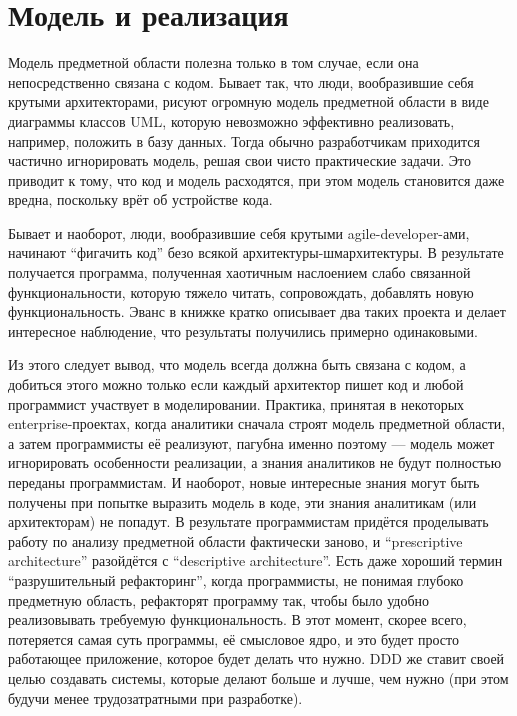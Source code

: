 \documentclass{../../text-style}
\begin{document}
\section{Модель и реализация}

Модель предметной области полезна только в том случае, если она непосредственно связана с кодом. Бывает так, что люди, вообразившие себя крутыми архитекторами, рисуют огромную модель предметной области в виде диаграммы классов UML, которую невозможно эффективно реализовать, например, положить в базу данных. Тогда обычно разработчикам приходится частично игнорировать модель, решая свои чисто практические задачи. Это приводит к тому, что код и модель расходятся, при этом модель становится даже вредна, поскольку врёт об устройстве кода.

Бывает и наоборот, люди, вообразившие себя крутыми agile-developer-ами, начинают ``фигачить код'' безо всякой архитектуры-шмархитектуры. В результате получается программа, полученная хаотичным наслоением слабо связанной функциональности, которую тяжело читать, сопровождать, добавлять новую функциональность. Эванс в книжке кратко описывает два таких проекта и делает интересное наблюдение, что результаты получились примерно одинаковыми.

Из этого следует вывод, что модель всегда должна быть связана с кодом, а добиться этого можно только если каждый архитектор пишет код и любой программист участвует в моделировании. Практика, принятая в некоторых enterprise-проектах, когда аналитики сначала строят модель предметной области, а затем программисты её реализуют, пагубна именно поэтому --- модель может игнорировать особенности реализации, а знания аналитиков не будут полностью переданы программистам. И наоборот, новые интересные знания могут быть получены при попытке выразить модель в коде, эти знания аналитикам (или архитекторам) не попадут. В результате программистам придётся проделывать работу по анализу предметной области фактически заново, и ``prescriptive architecture'' разойдётся с ``descriptive architecture''. Есть даже хороший термин ``разрушительный рефакторинг'', когда программисты, не понимая глубоко предметную область, рефакторят программу так, чтобы было удобно реализовывать требуемую функциональность. В этот момент, скорее всего, потеряется самая суть программы, её смысловое ядро, и это будет просто работающее приложение, которое будет делать что нужно. DDD же ставит своей целью создавать системы, которые делают больше и лучше, чем нужно (при этом будучи менее трудозатратными при разработке).
\end{document}
